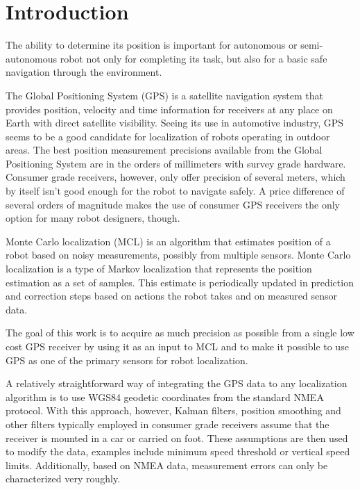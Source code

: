 \chapter{Introduction}


The ability to determine its position is important for autonomous or semi-autonomous robot
not only for completing its task, but also for a basic
safe navigation through the environment.


The Global Positioning System (GPS) is a satellite navigation system that
provides position, velocity and time information for receivers at any place on Earth with direct
satellite visibility.
Seeing its use in automotive industry, GPS seems to be a good candidate for
localization of robots operating in outdoor areas.
The best position measurement precisions available from the Global Positioning System
are in the orders of millimeters with survey grade hardware.
Consumer grade receivers, however, only offer precision of several meters, which
by itself isn't good enough for the robot to navigate safely.
A price difference of several orders of magnitude makes the use of consumer GPS
receivers the only option for many robot designers, though.


Monte Carlo localization (MCL) is an algorithm that estimates position of a robot
based on noisy measurements, possibly from multiple sensors.
Monte Carlo localization is a type of Markov localization that represents the position estimation as
a set of samples.
This estimate is periodically updated in prediction and correction steps based on
actions the robot takes and on measured sensor data.


\vspace{1.5em}

The goal of this work is to acquire as much precision as possible from a single low cost
GPS receiver by using it as an input to MCL and to make it possible to use
GPS as one of the primary sensors for robot localization.

A relatively straightforward way of integrating the GPS data to any localization algorithm is
to use WGS84 geodetic coordinates from the standard NMEA protocol.
With this approach, however, Kalman filters, position smoothing and other filters typically
employed in  consumer grade receivers assume that the receiver is mounted in a car or carried on foot.
These assumptions are then used to modify the data, examples
include minimum speed threshold or vertical speed limits.
Additionally, based on NMEA data, measurement errors can only be characterized very roughly.


